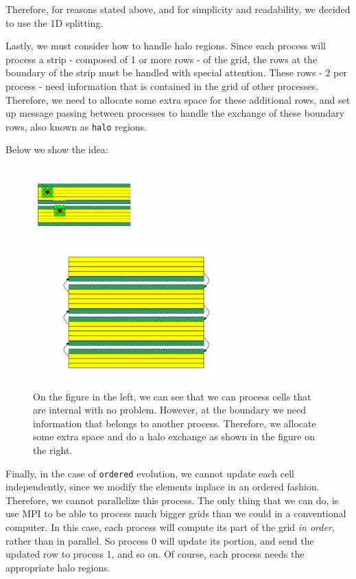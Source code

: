 \documentclass{report}
\begin{document}
Therefore, for reasons stated above, and for simplicity and readability, we 
decided to use the 1D splitting.

Lastly, we must consider how to handle halo regions. Since each process will 
process a strip - composed of 1 or more rows - of the grid, the rows at the 
boundary of the strip must be handled with special attention. These rows - 2 per 
process - need information that is contained in the grid of other processes.
Therefore, we need to allocate some extra space for these additional rows, and 
set up message passing between processes to handle the exchange of these 
boundary rows, also known as \texttt{halo} regions.

Below we show the idea:

\begin{figure}[H]
\centering
\includegraphics[width=4cm, height=3cm]{./other_images/stencil.png}
\includegraphics[width=8cm, height=5cm]{./other_images/halo_exchange.png}
\caption{\label{fig:haloexchange} On the figure in the left, we can see that 
we can process cells that are internal with no problem. However, at the boundary 
we need information that belongs to another process. Therefore, we allocate 
some extra space and do a halo exchange as shown in the figure on the right.}
\end{figure}

Finally, in the case of \texttt{ordered} evolution, we cannot update each cell 
independently, since we modify the elements inplace in an ordered fashion. 
Therefore, we cannot parallelize this process. The only thing that we can do, is 
use MPI to be able to process much bigger grids than we could in a conventional 
computer. In this case, each process will compute its part of the grid 
\textit{in order}, rather than in parallel. So process 0 will update its portion, 
and send the updated row to process 1, and so on. Of course, each process needs 
the appropriate halo regions. 
\end{document}

